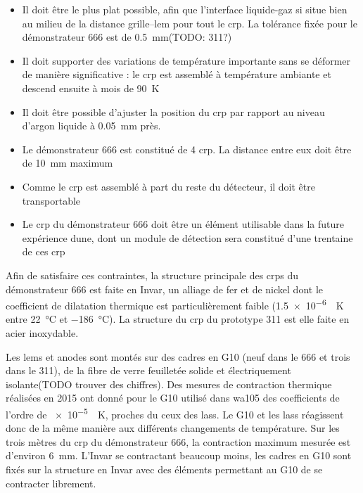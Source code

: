             \begin{itemize}
                \item Il doit être le plus plat possible, afin que l'interface liquide-gaz si situe bien au milieu de la distance grille--\gls{lem} pour tout le \gls{crp}. La tolérance fixée pour le démonstrateur 666 est de \SI{0.5}{\milli\meter}(TODO: 311?)
                \item Il doit supporter des variations de température importante sans se déformer de manière significative : le \gls{crp} est assemblé à température ambiante et descend ensuite à mois de \SI{90}{\kelvin}
                \item Il doit être possible d'ajuster la position du \gls{crp} par rapport au niveau d'argon liquide à \SI{0.05}{\milli\meter} près.
                \item Le démonstrateur 666 est constitué de 4 \gls{crp}. La distance entre eux doit être de \SI{10}{\milli\meter} maximum
                \item Comme le \gls{crp} est assemblé à part du reste du détecteur, il doit être transportable
                \item Le \gls{crp} du démonstrateur 666 doit être un élément utilisable dans la future expérience \gls{dune}, dont un module de détection sera constitué d'une trentaine de ces \gls{crp}
            \end{itemize}
            
            Afin de satisfaire ces contraintes, la structure principale des \glspl{crp} du démonstrateur 666 est faite en Invar, un alliage de fer et de nickel dont le coefficient de dilatation thermique est particulièrement faible (\SI{1.5e-6}{\per\kelvin} entre \SI{22}{\celsius} et \SI{-186}{\celsius}). La structure du \gls{crp} du prototype 311 est elle faite en acier inoxydable.
            
            Les \glspl{lem} et anodes sont montés sur des cadres en G10 (neuf dans le 666 et trois dans le 311), de la fibre de verre feuilletée solide et électriquement isolante(TODO trouver des chiffres). Des mesures de contraction thermique réalisées en 2015 ont donné pour le G10 utilisé dans \gls{wa105} des coefficients de l'ordre de \SI{e-5}{\per\kelvin}, proches du ceux des \glspl{las}. Le G10 et les \glspl{las} réagissent donc de la même manière aux différents changements de température. Sur les trois mètres du \gls{crp} du démonstrateur 666, la contraction maximum mesurée est d'environ \SI{6}{\milli\meter}. L'Invar se contractant beaucoup moins, les cadres en G10 sont fixés sur la structure en Invar avec des éléments permettant au G10 de se contracter librement.
            
